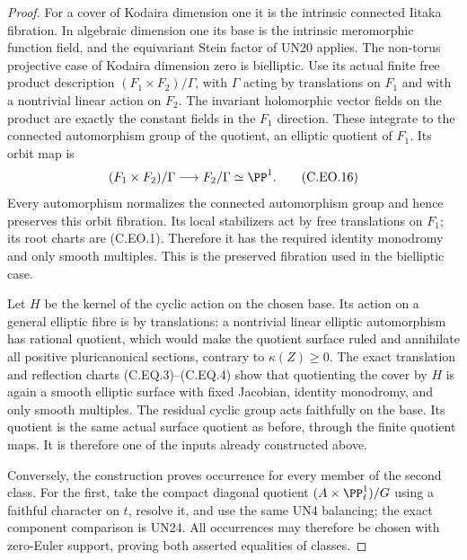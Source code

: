\begin{proof}
For a cover of Kodaira
dimension one it is the
intrinsic connected Iitaka
fibration. In algebraic
dimension one its base is
the intrinsic meromorphic
function field, and the
equivariant Stein factor
of UN20 applies. The
non-torus projective case
of Kodaira dimension zero
is bielliptic. Use its
actual finite free product
description
$(F_1\times F_2)/\Gamma$,
with $\Gamma$ acting by
translations on $F_1$
and with a nontrivial
linear action on $F_2$.
The invariant holomorphic
vector fields on the
product are exactly the
constant fields in the
$F_1$ direction. These
integrate to the connected
automorphism group of
the quotient, an elliptic
quotient of $F_1$.
Its orbit map is
\[
 (F_1\times F_2)/\Gamma
                   \longrightarrow F_2/\Gamma\simeq\PP^1.
                                                               \tag{C.EO.16}
\]
Every automorphism normalizes
the connected automorphism
group and hence preserves
this orbit fibration. Its
local stabilizers act by
free translations on
$F_1$; its root charts
are (C.EO.1). Therefore
it has the required
identity monodromy and
only smooth multiples.
This is the preserved
fibration used in the
bielliptic case.

Let $H$ be the kernel of
the cyclic action on the
chosen base. Its action
on a general elliptic
fibre is by translations:
a nontrivial linear
elliptic automorphism
has rational quotient,
which would make the
quotient surface ruled
and annihilate all
positive pluricanonical
sections, contrary to
$\kappa(Z)\ge0$.
The exact translation
and reflection charts
(C.EQ.3)--(C.EQ.4)
show that quotienting
the cover by $H$ is
again a smooth elliptic
surface with fixed
Jacobian, identity
monodromy, and only
smooth multiples.
The residual cyclic
group acts faithfully
on the base. Its
quotient is the same
actual surface quotient
as before, through
the finite quotient
maps. It is therefore
one of the inputs
already constructed
above.

Conversely, the
construction proves
occurrence for every
member of the second
class. For the first,
take the compact
diagonal quotient
$(A\times\PP^1_t)/G$
using a faithful
character on $t$,
resolve it, and use
the same UN4 balancing;
the exact component
comparison is UN24.
All occurrences may
therefore be chosen
with zero-Euler
support, proving
both asserted
equalities of classes.
\end{proof}
